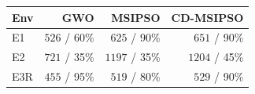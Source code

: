 \begin{tabular}{lrrr}
\hline
Env & GWO & MSIPSO & CD-MSIPSO \\
\hline
E1 & $526$ / 60\% & $625$ / 90\% & $651$ / 90\% \\
E2 & $721$ / 35\% & $1197$ / 35\% & $1204$ / 45\% \\
E3R & $455$ / 95\% & $519$ / 80\% & $529$ / 90\% \\
\hline
\end{tabular}